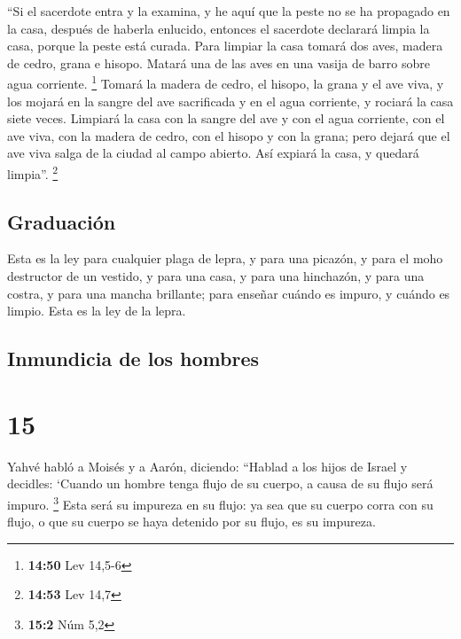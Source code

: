  ``Si el sacerdote entra y la examina, y he aquí que la
peste no se ha propagado en la casa, después de haberla enlucido,
entonces el sacerdote declarará limpia la casa, porque la peste está
curada.  Para limpiar la casa tomará dos aves, madera de
cedro, grana e hisopo.  Matará una de las aves en una
vasija de barro sobre agua corriente. \footnote{\textbf{14:50} Lev
  14,5-6}  Tomará la madera de cedro, el hisopo, la grana
y el ave viva, y los mojará en la sangre del ave sacrificada y en el
agua corriente, y rociará la casa siete veces.  Limpiará
la casa con la sangre del ave y con el agua corriente, con el ave viva,
con la madera de cedro, con el hisopo y con la grana; 
pero dejará que el ave viva salga de la ciudad al campo abierto. Así
expiará la casa, y quedará limpia''. \footnote{\textbf{14:53} Lev 14,7}

\hypertarget{graduaciuxf3n}{%
\subsection{Graduación}\label{graduaciuxf3n}}

 Esta es la ley para cualquier plaga de lepra, y para una
picazón,  y para el moho destructor de un vestido, y para
una casa,  y para una hinchazón, y para una costra, y
para una mancha brillante;  para enseñar cuándo es
impuro, y cuándo es limpio. Esta es la ley de la lepra.

\hypertarget{inmundicia-de-los-hombres}{%
\subsection{Inmundicia de los hombres}\label{inmundicia-de-los-hombres}}

\hypertarget{section-14}{%
\section{15}\label{section-14}}

 Yahvé habló a Moisés y a Aarón, diciendo: 
``Hablad a los hijos de Israel y decidles: `Cuando un hombre tenga flujo
de su cuerpo, a causa de su flujo será impuro. \footnote{\textbf{15:2}
  Núm 5,2}  Esta será su impureza en su flujo: ya sea que
su cuerpo corra con su flujo, o que su cuerpo se haya detenido por su
flujo, es su impureza.

